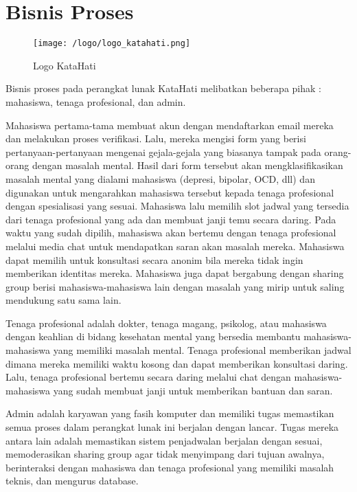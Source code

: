 \documentclass{article}
\begin{document}
	\section{Bisnis Proses}
	\begin{figure}[H]
	\centering	
	\texttt{[image: /logo/logo\_katahati.png]}
	\caption{Logo KataHati}
	\end{figure}
	\par
	Bisnis proses pada perangkat lunak KataHati melibatkan beberapa pihak : mahasiswa, tenaga profesional, dan admin.
	\par
	Mahasiswa pertama-tama membuat akun dengan mendaftarkan email mereka dan melakukan proses verifikasi. Lalu, mereka mengisi form yang berisi pertanyaan-pertanyaan mengenai gejala-gejala yang biasanya tampak pada orang-orang dengan masalah mental. Hasil dari form tersebut akan mengklasifikasikan masalah mental yang dialami mahasiswa (depresi, bipolar, OCD, dll) dan digunakan untuk mengarahkan mahasiswa tersebut kepada tenaga profesional dengan spesialisasi yang sesuai. Mahasiswa lalu memilih slot jadwal yang tersedia dari tenaga profesional yang ada dan membuat janji temu secara daring. Pada waktu yang sudah dipilih, mahasiswa akan bertemu dengan tenaga profesional melalui media chat untuk mendapatkan saran akan masalah mereka. Mahasiswa dapat memilih untuk konsultasi secara anonim bila mereka tidak ingin memberikan identitas mereka. Mahasiswa juga dapat bergabung dengan sharing group berisi mahasiswa-mahasiswa lain dengan masalah yang mirip untuk saling mendukung satu sama lain.
	\par
	Tenaga profesional adalah dokter, tenaga magang, psikolog, atau mahasiswa dengan keahlian di bidang kesehatan mental yang bersedia membantu mahasiswa-mahasiswa yang memiliki masalah mental. Tenaga profesional memberikan jadwal dimana mereka memiliki waktu kosong dan dapat memberikan konsultasi daring. Lalu, tenaga profesional bertemu secara daring melalui chat dengan mahasiswa-mahasiswa yang sudah membuat janji untuk memberikan bantuan dan saran.
	\par
	Admin adalah karyawan yang fasih komputer dan memiliki tugas memastikan semua proses dalam perangkat lunak ini berjalan dengan lancar. Tugas mereka antara lain adalah memastikan sistem penjadwalan berjalan dengan sesuai, memoderasikan sharing group agar tidak menyimpang dari tujuan awalnya, berinteraksi dengan mahasiswa dan tenaga profesional yang memiliki masalah teknis, dan mengurus database. 
	
\end{document}
